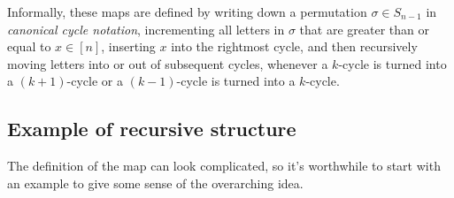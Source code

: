 Informally, these maps are defined by writing down a permutation $\sigma \in S_{n-1}$ in
\emph{canonical cycle notation}, incrementing all letters in $\sigma$
that are greater than or equal to $x \in [n]$,
inserting $x$ into the rightmost cycle, and then recursively moving letters into or out of subsequent cycles,
whenever a $k$-cycle is turned into a $(k+1)$-cycle or a $(k-1)$-cycle is
turned into a $k$-cycle.

\subsection{Example of recursive structure}

The definition of the map can look complicated, so it's worthwhile to start with
an example to give some sense of the overarching idea.


